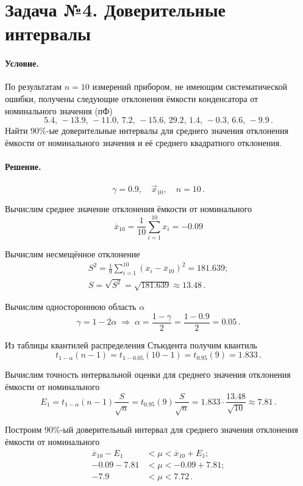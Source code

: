 
\section{Задача №4. Доверительные интервалы}

\paragraph{Условие.} По результатам $n = 10$ измерений прибором, не имеющим систематической ошибки, получены следующие отклонения ёмкости конденсатора от номинального значения (пФ)
\[
    5.4,\, -13.9,\, -11.0,\, 7.2,\, -15.6,\, 29.2,\, 1.4,\, -0.3,\, 6.6,\, -9.9\,.
\]
Найти $90\%$-ые доверительные интервалы для среднего значения отклонения ёмкости от номинального значения и её среднего квадратного отклонения.

\paragraph{Решение.}

\[
    \gamma = 0.9, \quad \vec{x}_{10}, \quad n = 10\,.
\]

\noindent
Вычислим среднее значение отклонения ёмкости от номинального
\[
    \overline{x}_{10} = \frac{1}{10} \sum_{i = 1}^{10} x_i = -0.09 
\]

\noindent
Вычислим несмещённое отклонение
\begin{gather*}
    S^2 = \frac{1}{9} \sum_{i = 1}^{10} (x_i - \overline{x}_{10})^2 = 181.639;
    \\
    S = \sqrt{S^2} = \sqrt{181.639} \approx 13.48\,.
\end{gather*}

\noindent
Вычислим одностороннюю область $\alpha$
\[
    \gamma = 1 - 2\alpha \;\Rightarrow\; \alpha = \frac{1 - \gamma}{2} = \frac{1 - 0.9}{2} = 0.05\,.
\]

\noindent
Из таблицы квантилей распределения Стьюдента получим квантиль
\[
    t_{1 - \alpha}(n - 1) = t_{1 - 0.05}(10 - 1) = t_{0.95}(9) = 1.833\,.
\]

\noindent
Вычислим точность интервальной оценки для среднего значения отклонения ёмкости от номинального
\[
    E_1 = t_{1 - \alpha}(n - 1) \frac{S}{\sqrt{n}} = t_{0.95}(9)\frac{S}{\sqrt{n}} = 1.833 \cdot \frac{13.48}{\sqrt{10}} \approx 7.81\,.
\]

\noindent
Построим $90\%$-ый доверительный интервал для среднего значения отклонения ёмкости от номинального
\begin{align*}
    \overline{x}_{10} - E_1 &< \mu < \overline{x}_{10} + E_1;
    \\
    -0.09 - 7.81 &< \mu <  -0.09 + 7.81;
    \\
    -7.9 &< \mu < 7.72\,.
\end{align*}

